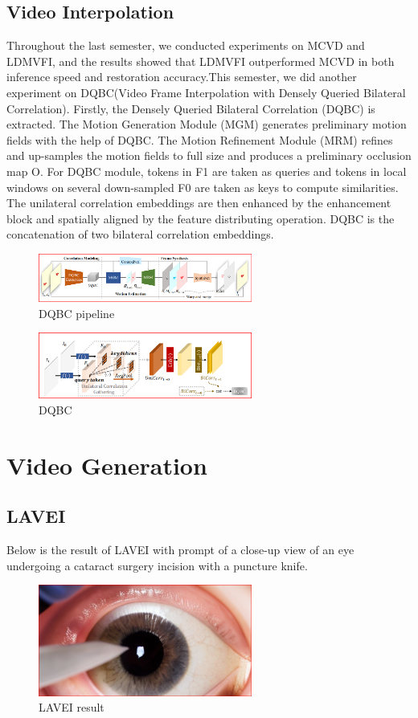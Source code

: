 \documentclass[lettersize,journal]{IEEEtran}
\begin{document}
\subsection{Video Interpolation}
Throughout the last semester, we conducted experiments on MCVD and LDMVFI, and the results showed that LDMVFI outperformed MCVD in both inference speed and restoration accuracy.This semester, we did another experiment on DQBC(Video Frame Interpolation with Densely Queried Bilateral Correlation). Firstly, the Densely Queried Bilateral Correlation (DQBC) is extracted. The Motion Generation Module (MGM) generates preliminary motion fields with the help of DQBC. The Motion Refinement Module (MRM) refines and up-samples the motion fields to full size and produces a preliminary occlusion map O. For DQBC module, tokens in F1 are taken as queries and tokens in local windows on several down-sampled F0 are taken as keys to compute similarities. The unilateral correlation embeddings are then enhanced by the enhancement block and spatially aligned by the feature distributing operation. DQBC is the concatenation of two bilateral correlation embeddings.
\begin{figure}[h!]
    \centering
    \includegraphics[width=7cm]{Image/DQBC pipeline.png}
    \caption{DQBC pipeline}
    \label{fig-sample}
\end{figure}
\begin{figure}[h!]
    \centering
    \includegraphics[width=7cm]{Image/DQBC.png}
    \caption{DQBC}
    \label{fig-sample}
\end{figure}


\section{Video Generation}

\subsection{LAVEI}
Below is the result of LAVEI with prompt of a close-up view of an eye undergoing a cataract surgery incision with a puncture knife.
\begin{figure}[h!]
    \centering
    \includegraphics[width=7cm]{Image/LAVEI result.png}
    \caption{LAVEI result}
    \label{fig-sample}
\end{figure}
\end{document}
